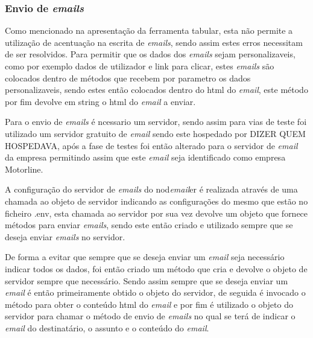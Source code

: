 \subsubsection{Envio de \textit{emails}}
Como mencionado na apresentação da ferramenta tabular, esta não permite a utilização de acentuação na escrita de \textit{emails}, sendo assim estes erros necessitam de ser resolvidos. Para permitir que os dados dos \textit{emails} sejam personalizaveis, como por exemplo dados de utilizador e link para clicar, estes \textit{emails} são colocados dentro de métodos que recebem por parametro os dados personalizaveis, sendo estes então colocados dentro do html do \textit{email}, este método por fim devolve em string o html do \textit{email} a enviar.

Para o envio de \textit{emails} é ncessario um servidor, sendo assim para vias de teste foi utilizado um servidor gratuito de \textit{email} sendo este hospedado por DIZER QUEM HOSPEDAVA, após a fase de testes foi então alterado para o servidor de \textit{email} da empresa permitindo assim que este \textit{email} seja identificado como empresa Motorline.

A configuração do servidor de \textit{emails} do nod\textit{email}er é realizada através de uma chamada ao objeto 
de servidor indicando as configurações do mesmo que estão no ficheiro .env, esta chamada ao servidor por sua vez devolve um objeto que fornece métodos para enviar \textit{emails}, sendo este então criado e utilizado sempre que se deseja enviar \textit{emails} no servidor.


De forma a evitar que sempre que se deseja enviar um \textit{email} seja necessário indicar todos os dados, foi então criado um método que cria e devolve o objeto de servidor sempre que necessário. Sendo assim sempre que se deseja enviar um \textit{email} é então primeiramente obtido o objeto do servidor, de seguida é invocado o método para obter o conteúdo html do \textit{email} e por fim é utilizado o objeto do servidor para chamar o método de envio de \textit{emails} no qual se terá de indicar o \textit{email} do destinatário, o assunto e o conteúdo do \textit{email}.
